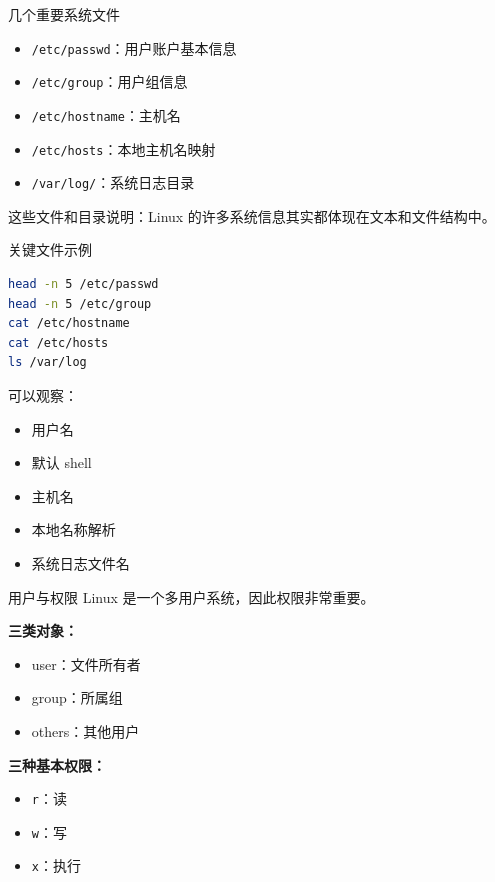 \documentclass[aspectratio=169]{beamer}
\begin{document}
\begin{frame}{几个重要系统文件}
\begin{itemize}
  \item \texttt{/etc/passwd}：用户账户基本信息
  \item \texttt{/etc/group}：用户组信息
  \item \texttt{/etc/hostname}：主机名
  \item \texttt{/etc/hosts}：本地主机名映射
  \item \texttt{/var/log/}：系统日志目录
\end{itemize}

\vspace{0.5em}
这些文件和目录说明：Linux 的许多系统信息其实都体现在文本和文件结构中。
\end{frame}

\begin{frame}[fragile]{关键文件示例}
\begin{lstlisting}[language=bash]
head -n 5 /etc/passwd
head -n 5 /etc/group
cat /etc/hostname
cat /etc/hosts
ls /var/log
\end{lstlisting}

\vspace{0.5em}
可以观察：
\begin{itemize}
  \item 用户名
  \item 默认 shell
  \item 主机名
  \item 本地名称解析
  \item 系统日志文件名
\end{itemize}
\end{frame}

\begin{frame}{用户与权限}
Linux 是一个多用户系统，因此权限非常重要。

\vspace{0.5em}
\textbf{三类对象：}
\begin{itemize}
  \item user：文件所有者
  \item group：所属组
  \item others：其他用户
\end{itemize}

\vspace{0.5em}
\textbf{三种基本权限：}
\begin{itemize}
  \item \texttt{r}：读
  \item \texttt{w}：写
  \item \texttt{x}：执行
\end{itemize}
\end{frame}
\end{document}
